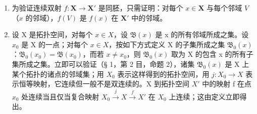 \begin{enumerate}
\def\labelenumi{\arabic{enumi})}
\setcounter{enumi}{1}
\item
  为验证连续双射 \(f: \mathbf{X} \to \mathbf{X}'\) 是同胚，只需证明：对每个 \(x \in \mathbf{X}\) 与每个邻域 \(V\)（\(x\) 的邻域），\(f(V)\) 是 \(f(x)\) 在 \(\mathbf{X}'\) 中的邻域。
\item
  设 X 是拓扑空间，对每个 \(x \in X\)，设 \(\mathfrak{B}(x)\) 是 x 的所有邻域所成之集。设 \(x_{0}\) 是 X 的一点；对每个 \(x \in X\)，按如下方式定义 X 的子集所成之集 \(\mathfrak{B}_{0}(x)\)：\(\mathfrak{B}_{0}(x_{0}) = \mathfrak{B}(x_{0})\)，而若 \(x \neq x_{0}\)，则 \(\mathfrak{B}_{0}(x)\) 取为 X 的包含 x 的所有子集所成之集。立即可以验证（§ 1，第 2 目，命题 2），诸集 \(\mathfrak{B}_{0}(x)\) 是 X 上某个拓扑的诸点的邻域集；用 \(X_{0}\) 表示这样得到的拓扑空间，用 \(j : X_{0} \to X\) 表示恒等映射，它连续但一般不是双连续的。X 到拓扑空间 \(X'\) 中的映射 f 在点 \(x_{0}\) 处连续当且仅当复合映射 \(X_{0} \stackrel{j}{\to} X \stackrel{f}{\to} X'\) 在 \(X_{0}\) 上连续；这由定义立即得出。
\end{enumerate}

